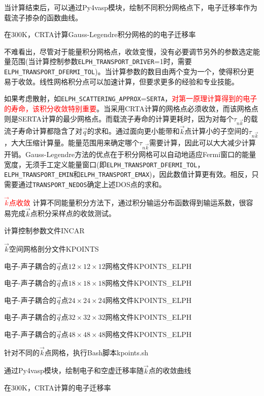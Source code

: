 当计算结束后，可以通过\textrm{Py4vasp}模块，绘制不同积分网格点下，电子迁移率作为载流子掺杂的函数曲线。

在\textrm{300K}，\textrm{CRTA}计算\textrm{Gauss-Legendre}积分网格的的电子迁移率

不难看出，尽管对于能量积分网格点，收敛变慢，没有必要调节另外的参数选定能量范围\textrm{(当计算控制参数\texttt{ELPH\_TRANSPORT\_DRIVER}=1时，需要\texttt{ELPH\_TRANSPORT\_DFERMI\_TOL})}。当计算参数的数目由两个变为一个，使得积分更易于收敛。线性网格积分点可以加速计算，但要求更多的经验和专业技能。

如果考虑散射，如\texttt{ELPH\_SCATTERING\_APPROX}=\texttt{SERTA}，\textcolor{red}{对第一原理计算得到的电子的寿命，该积分收敛特别重要}。当采用\textrm{CRTA}计算的网格点必须收敛，而该网格点则是\textrm{SERTA}计算的最少网格点。而载流子寿命的计算更耗时，因为对每个$\tau_{n\vec k}$的载流子寿命计算都隐含了对$\vec q$的求和。通过面向更小能带和$\vec k$点计算小的子空间的$\tau_{n\vec k}$，大大压缩计算量。能量范围用来确定哪个$\tau_{n\vec k}$需要计算，因此可以大大减少计算开销。\textrm{Gauss-Legendre}方法的优点在于积分网格可以自动地适应\textrm{Fermi}窗口的能量宽度，无须手工定义能量窗口(即\texttt{ELPH\_TRANSPORT\_DFERMI\_TOL}，\texttt{ELPH\_TRANSPORT\_EMIN}和\texttt{ELPH\_TRANSPORT\_EMAX})，因此数值计算更有效。相反，只需要通过\texttt{TRANSPORT\_NEDOS}确定上述\textrm{DOS}点的求和。

\textcolor{red}{$\vec k$点收敛}
计算不同能量积分方法下，通过积分输运分布函数得到输运系数，很容易完成$\vec k$点积分采样点的收敛测试。

计算控制参数文件\textrm{INCAR}

$\vec k$空间网格剖分文件\textrm{KPOINTS}

电子-声子耦合的$\vec q$点$12\times12\times12$网格文件\textrm{KPOINTS\_ELPH}

电子-声子耦合的$\vec q$点$18\times18\times18$网格文件\textrm{KPOINTS\_ELPH}

电子-声子耦合的$\vec q$点$24\times24\times24$网格文件\textrm{KPOINTS\_ELPH}

电子-声子耦合的$\vec q$点$32\times32\times32$网格文件\textrm{KPOINTS\_ELPH}

电子-声子耦合的$\vec q$点$48\times48\times48$网格文件\textrm{KPOINTS\_ELPH}

针对不同的$\vec k$点网格，执行\textrm{Bash}脚本\textrm{kpoints.sh}

通过\textrm{Py4vasp}模块，绘制电子和空虚迁移率随$\vec k$点的收敛曲线

在\textrm{300K}，\textrm{CRTA}计算的电子迁移率

